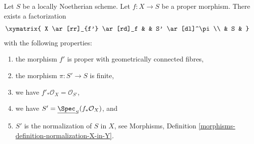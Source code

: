%
\begin{theorem}
\label{theorem-stein-factorization-Noetherian}
Let $S$ be a locally Noetherian scheme.
Let $f : X \to S$ be a proper morphism.
There exists a factorization
$$
\xymatrix{
X \ar[rr]_{f'} \ar[rd]_f & & S' \ar[dl]^\pi \\
& S &
}
$$
with the following properties:
\begin{enumerate}
\item the morphism $f'$ is proper with geometrically connected fibres,
\item the morphism $\pi : S' \to S$ is finite,
\item we have $f'_*\mathcal{O}_X = \mathcal{O}_{S'}$,
\item we have $S' = \underline{\Spec}_S(f_*\mathcal{O}_X)$, and
\item $S'$ is the normalization of $S$ in $X$, see
Morphisms, Definition \ref{morphisms-definition-normalization-X-in-Y}.
\end{enumerate}
\end{theorem}

